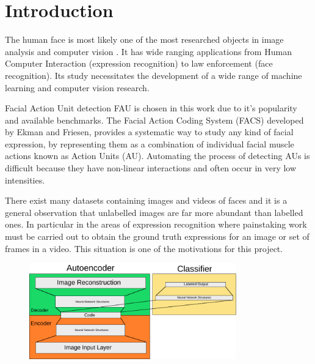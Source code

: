 \chapter{Introduction} \label{chap:intro}

  The human face is most likely one of the most researched objects in image analysis
  and computer vision \cite{S.ZafeiriouA.PapaioannouI.KotsiaM.A.Nicolaou}.
  It has wide ranging applications from Human
  Computer Interaction (expression recognition) to law enforcement (face recognition).
  Its study necessitates the development of a wide range of machine
  learning and computer vision research.

  Facial Action Unit detection FAU \cite{Corneanu2016} is chosen in this work due
  to it's popularity and available benchmarks.
  The Facial Action Coding System (FACS) developed by Ekman and Friesen,
  provides a systematic way to study any kind of facial expression,
  by representing them as a combination of individual facial muscle actions
  known as Action Units (AU). Automating the process of detecting AUs is difficult
  because they have non-linear interactions and often occur in very low intensities. %

  There exist many datasets containing images and videos of faces and it is a general
  observation that unlabelled images are far more abundant than labelled ones.
  In particular in the areas of expression recognition where painstaking work
  must be carried out to obtain the ground truth expressions for an image or set of
  frames in a video. This situation is one of the motivations for this project.

  \begin{figure}
   \centering
   \includegraphics[width=0.8\textwidth]{illustrations/simple_network.pdf}
  \end{figure}

